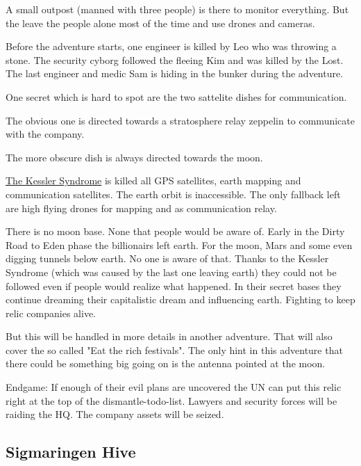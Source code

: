 A small outpost (manned with three people) is there to monitor everything. But the leave the people alone most of the time and use drones and cameras.

Before the adventure starts, one engineer is killed by Leo who was throwing a stone. The security cyborg followed the fleeing Kim and was killed by the Lost.
The last engineer and medic Sam is hiding in the bunker during the adventure.

One secret which is hard to spot are the two sattelite dishes for communication.

The obvious one is directed towards a stratosphere relay zeppelin to communicate with the company.

The more obscure dish is always directed towards the moon.

\begin{sidebarBox}[title=Kessler Syndrome]

    \hyperref[sec: sec: Kessler Syndrome]{The Kessler Syndrome} is killed all GPS satellites, earth mapping and communication satellites. The earth orbit is inaccessible. The only fallback left are high flying drones for mapping and as communication relay.
\end{sidebarBox}


\begin{sidebarBox}[title=Moon base]

    There is no moon base. None that people would be aware of. Early in the Dirty Road to Eden phase the billionairs left earth. For the moon, Mars and some even digging tunnels below earth. No one is aware of that. Thanks to the Kessler Syndrome (which was caused by the last one leaving earth) they could not be followed even if people would realize what happened.
    In their secret bases they continue dreaming their capitalistic dream and influencing earth. Fighting to keep relic companies alive.

    But this will be handled in more details in another adventure. That will also cover the so called "Eat the rich festivals". The only hint in this adventure that there could be something big going on is the antenna pointed at the moon.
\end{sidebarBox}

Endgame: If enough of their evil plans are uncovered the UN can put this relic right at the top of the dismantle-todo-list. Lawyers and security forces will be raiding the HQ. The company assets will be seized.

\subsection{Sigmaringen Hive}

